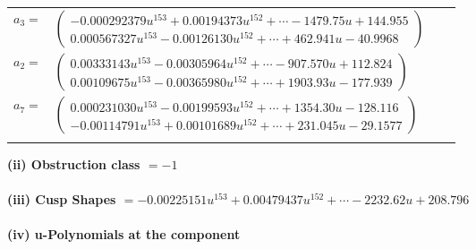 \documentclass[1p]{elsarticle_modified}
\theoremstyle{definition}
\begin{document}
\begin{tabular}{m{7pt} m{180pt} m{7pt} m{180pt} }
\flushright $a_{3}=$&$\begin{pmatrix}-0.000292379 u^{153}+0.00194373 u^{152}+\cdots-1479.75 u+144.955\\0.000567327 u^{153}-0.00126130 u^{152}+\cdots+462.941 u-40.9968\end{pmatrix}$ \\
\flushright $a_{2}=$&$\begin{pmatrix}0.00333143 u^{153}-0.00305964 u^{152}+\cdots-907.570 u+112.824\\0.00109675 u^{153}-0.00365980 u^{152}+\cdots+1903.93 u-177.939\end{pmatrix}$ \\
\flushright $a_{7}=$&$\begin{pmatrix}0.000231030 u^{153}-0.00199593 u^{152}+\cdots+1354.30 u-128.116\\-0.00114791 u^{153}+0.00101689 u^{152}+\cdots+231.045 u-29.1577\end{pmatrix}$\\&\end{tabular}
\flushleft \textbf{(ii) Obstruction class $= -1$}\\~\\
\flushleft \textbf{(iii) Cusp Shapes $= -0.00225151 u^{153}+0.00479437 u^{152}+\cdots-2232.62 u+208.796$}\\~\\
\newpage\renewcommand{\arraystretch}{1}
\flushleft \textbf{(iv) u-Polynomials at the component}\newline \\
\end{document}
